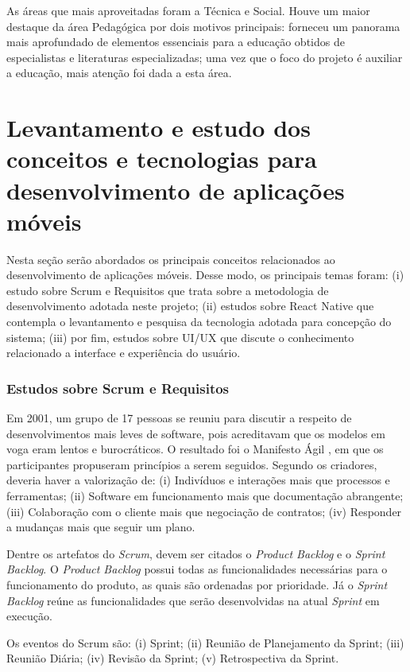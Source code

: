 As áreas que mais aproveitadas foram a Técnica e Social. Houve um maior destaque da área Pedagógica por dois motivos principais: forneceu um panorama mais aprofundado de elementos essenciais para a educação obtidos de especialistas e literaturas especializadas; uma vez que o foco do projeto é auxiliar a educação, mais atenção foi dada a esta área.

\section{Levantamento e estudo dos conceitos e tecnologias para desenvolvimento de aplicações móveis}

Nesta seção serão abordados os principais conceitos relacionados ao desenvolvimento de aplicações móveis. Desse modo, os principais temas foram: (i) estudo sobre Scrum e Requisitos que trata sobre a metodologia de desenvolvimento adotada neste projeto; (ii) estudos sobre React Native que contempla o levantamento e pesquisa da tecnologia adotada para concepção do sistema; (iii) por fim, estudos sobre UI/UX que discute o conhecimento relacionado a interface e experiência do usuário.

\subsubsection{Estudos sobre Scrum e Requisitos} 
Em 2001, um grupo de 17 pessoas se reuniu para discutir a respeito de desenvolvimentos mais leves de software, pois acreditavam que os modelos em voga eram lentos e burocráticos. O resultado foi o Manifesto Ágil \citep{agileManifesto}, em que os participantes propuseram princípios a serem seguidos. Segundo os criadores, deveria haver a valorização de: (i) Indivíduos e interações mais que processos e ferramentas; (ii) Software em funcionamento mais que documentação abrangente; (iii) Colaboração com o cliente mais que negociação de contratos; (iv) Responder a mudanças mais que seguir um plano.

Dentre os artefatos do \textit{Scrum}, devem ser citados o \textit{Product Backlog} e o \textit{Sprint Backlog}. O \textit{Product Backlog} possui todas as funcionalidades necessárias para o funcionamento do produto, as quais são ordenadas por prioridade. Já o \textit{Sprint Backlog} reúne as funcionalidades que serão desenvolvidas na atual \textit{Sprint} em execução.

Os eventos do Scrum são: (i) Sprint; (ii) Reunião de Planejamento da Sprint; (iii) Reunião Diária; (iv) Revisão da Sprint; (v) Retrospectiva da Sprint.

